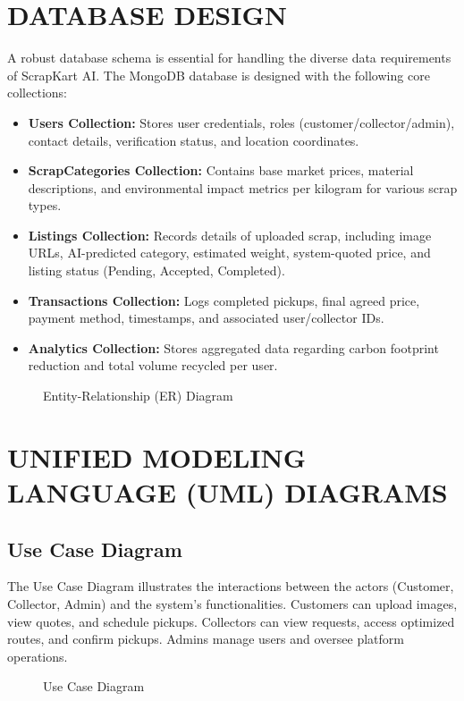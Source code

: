 \section{DATABASE DESIGN}
A robust database schema is essential for handling the diverse data requirements of ScrapKart AI. The MongoDB database is designed with the following core collections:
\begin{itemize}
    \item \textbf{Users Collection:} Stores user credentials, roles (customer/collector/admin), contact details, verification status, and location coordinates.
    \item \textbf{ScrapCategories Collection:} Contains base market prices, material descriptions, and environmental impact metrics per kilogram for various scrap types.
    \item \textbf{Listings Collection:} Records details of uploaded scrap, including image URLs, AI-predicted category, estimated weight, system-quoted price, and listing status (Pending, Accepted, Completed).
    \item \textbf{Transactions Collection:} Logs completed pickups, final agreed price, payment method, timestamps, and associated user/collector IDs.
    \item \textbf{Analytics Collection:} Stores aggregated data regarding carbon footprint reduction and total volume recycled per user.
\end{itemize}

\begin{figure}[H]
    \centering
    \vspace{5cm}
    \caption{Entity-Relationship (ER) Diagram}
    \label{fig:er_diagram}
\end{figure}

\section{UNIFIED MODELING LANGUAGE (UML) DIAGRAMS}

\subsection{Use Case Diagram}
The Use Case Diagram illustrates the interactions between the actors (Customer, Collector, Admin) and the system's functionalities. Customers can upload images, view quotes, and schedule pickups. Collectors can view requests, access optimized routes, and confirm pickups. Admins manage users and oversee platform operations.
\begin{figure}[H]
    \centering
    \vspace{5cm}
    \caption{Use Case Diagram}
    \label{fig:use_case}
\end{figure}

